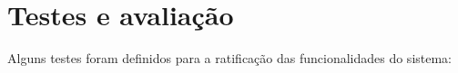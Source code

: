 



\section{Testes e avaliação}
Alguns testes foram definidos para a ratificação das funcionalidades do sistema:

